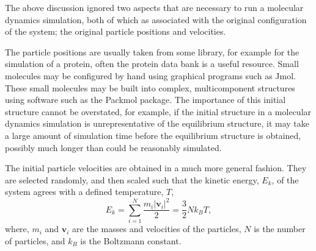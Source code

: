 The above discussion ignored two aspects that are necessary to run a molecular dynamics simulation, both of which as associated with the original configuration of the system; the original particle positions and velocities.

The particle positions are usually taken from some library, for example for the simulation of a protein, often the protein data bank\autocite{noauthor_rcsb_nodate} is a useful resource.
Small molecules may be configured by hand using graphical programs such as Jmol.\autocite{noauthor_jmol_nodate}
These small molecules may be built into complex, multicomponent structures using software such as the Packmol package.\autocite{martinez_packmol_2009}
The importance of this initial structure cannot be overstated, for example, if the initial structure in a molecular dynamics simulation is unrepresentative of the equilibrium structure, it may take a large amount of simulation time before the equilibrium structure is obtained, possibly much longer than could be reasonably simulated.

The initial particle velocities are obtained in a much more general fashion.
They are selected randomly, and then scaled such that the kinetic energy, $E_k$, of the system agrees with a defined temperature, $T$,
%
\begin{equation}
E_k = \sum_{i=1}^N{\frac{m_i|\mathbf{v}_i|^2}{2}} = \frac{3}{2}Nk_BT,
\label{equ:ek}
\end{equation}
%
where, $m_i$ and $\mathbf{v}_i$ are the masses and velocities of the particles, $N$ is the number of particles, and $k_B$ is the Boltzmann constant.

